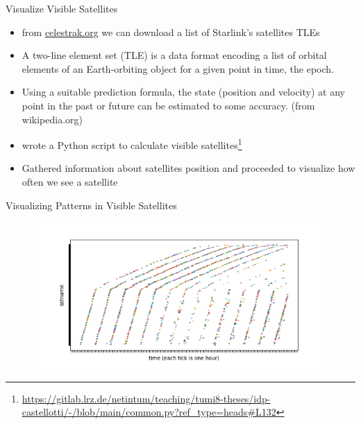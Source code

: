 \documentclass[NET,english,beameralt]{tumbeamer}
\begin{document}
\begin{frame}{Visualize Visible Satellites}
	\begin{itemize}
    	\item from \href{celestrak.org}{celestrak.org} we can download a list of Starlink's satellites TLEs
		\item A two-line element set (TLE) is a data format encoding a list of orbital elements of an Earth-orbiting
			object for a given point in time, the epoch. 
		\item Using a suitable prediction formula, the state (position and velocity) at any point in the past or future
			can be estimated to some accuracy. (from wikipedia.org)
		\item wrote a Python script to calculate visible
		satellites\footnote{\url{https://gitlab.lrz.de/netintum/teaching/tumi8-theses/idp-castellotti/-/blob/main/common.py?ref_type=heads\#L132}}
        \item Gathered information about satellites position and proceeded to visualize how often we see a satellite
    \end{itemize}
\end{frame}

\begin{frame}{Visualizing Patterns in Visible Satellites}
    \begin{figure}
        \includegraphics[width=1\textwidth]{pics/patterns-in-satellite-appearances.png}
    \end{figure}
\end{frame}
\end{document}
